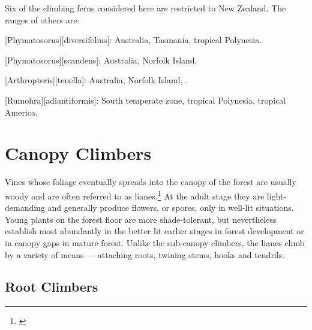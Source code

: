 Six of the climbing ferns considered here are restricted to New Zealand.
The ranges of others are:

[Phymatosorus][diversifolius]: Australia, Tasmania, tropical Polynesia.

[Phymatosorus][scandens]: Australia, Norfolk Island.

[Arthropteris][tenella]: Australia, Norfolk Island, .

[Rumohra][adiantiformis]: South temperate zone, tropical Polynesia, tropical America.

\section{Canopy Climbers}

Vines whose foliage eventually spreads into the canopy of the forest are usually woody and are often referred to as lianes.\footnote{\cite{bird1916observations}}
At the adult stage they are light-demanding and generally produce flowers, or spores, only in well-lit situations.
Young plants on the forest floor are more shade-tolerant, but nevertheless establish most abundantly in the better lit earlier stages in forest development or in canopy gaps in mature forest.
Unlike the sub-canopy climbers, the lianes climb by a variety of means --- attaching roots, twining stems, hooks and tendrils.

\subsection{Root Climbers}

